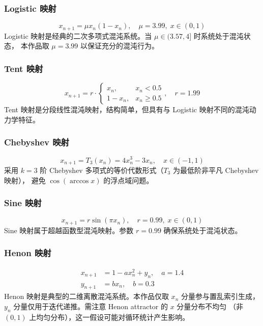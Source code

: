 \documentclass[12pt,a4paper]{ctexrep}
\begin{document}
\subsubsection*{Logistic 映射}
\begin{equation}\label{eq:logistic}
  x_{n+1} = \mu x_n (1 - x_n),\quad \mu = 3.99,\; x \in (0,1)
\end{equation}
Logistic 映射是经典的二次多项式混沌系统。当 $\mu \in (3.57, 4]$ 时系统处于混沌状态，
本作品取 $\mu = 3.99$ 以保证充分的混沌行为。

\subsubsection*{Tent 映射}
\begin{equation}\label{eq:tent}
  x_{n+1} = r \cdot \begin{cases}
    x_n, & x_n < 0.5 \\
    1 - x_n, & x_n \ge 0.5
  \end{cases},\quad r = 1.99
\end{equation}
Tent 映射是分段线性混沌映射，结构简单，但具有与 Logistic 映射不同的混沌动力学特征。

\subsubsection*{Chebyshev 映射}
\begin{equation}\label{eq:chebyshev}
  x_{n+1} = T_3(x_n) = 4x_n^3 - 3x_n,\quad x \in (-1, 1)
\end{equation}
采用 $k=3$ 阶 Chebyshev 多项式的等价代数形式（$T_3$ 为最低阶非平凡 Chebyshev 映射），
避免 $\cos(\arccos x)$ 的浮点域问题。

\subsubsection*{Sine 映射}
\begin{equation}\label{eq:sine}
  x_{n+1} = r \sin(\pi x_n),\quad r = 0.99,\; x \in (0,1)
\end{equation}
Sine 映射属于超越函数型混沌映射。参数 $r=0.99$ 确保系统处于混沌状态。

\subsubsection*{Henon 映射}
\begin{align}
  x_{n+1} &= 1 - a x_n^2 + y_n,\quad a = 1.4 \\
  y_{n+1} &= b x_n,\quad b = 0.3
\end{align}
Henon 映射是典型的二维离散混沌系统。本作品仅取 $x_n$ 分量参与置乱索引生成，
$y_n$ 分量仅用于迭代递推。需注意 Henon attractor 的 $x$ 分量分布不均匀
（非 $(0,1)$ 上均匀分布），这一假设可能对循环统计产生影响。
\end{document}
